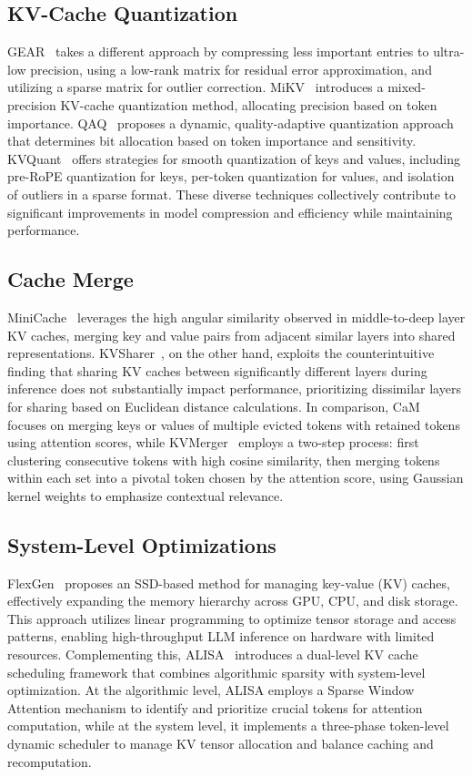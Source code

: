\subsection{KV-Cache Quantization}
GEAR~\cite{gear} takes a different approach by compressing less important entries to ultra-low precision, using a low-rank matrix for residual error approximation, and utilizing a sparse matrix for outlier correction. MiKV~\cite{notokenleftbehind} introduces a mixed-precision KV-cache quantization method, allocating precision based on token importance. QAQ~\cite{qaq} proposes a dynamic, quality-adaptive quantization approach that determines bit allocation based on token importance and sensitivity. KVQuant~\cite{hooper2024kvquant} offers strategies for smooth quantization of keys and values, including pre-RoPE quantization for keys, per-token quantization for values, and isolation of outliers in a sparse format. These diverse techniques collectively contribute to significant improvements in model compression and efficiency while maintaining performance.

\subsection{Cache Merge}
MiniCache~\cite{minicache} leverages the high angular similarity observed in middle-to-deep layer KV caches, merging key and value pairs from adjacent similar layers into shared representations. KVSharer~\cite{yang2024kvsharer}, on the other hand, exploits the counterintuitive finding that sharing KV caches between significantly different layers during inference does not substantially impact performance, prioritizing dissimilar layers for sharing based on Euclidean distance calculations. In comparison,  CaM~\cite{cam} focuses on merging keys or values of multiple evicted tokens with retained tokens using attention scores, while KVMerger~\cite{wang2024model} employs a two-step process: first clustering consecutive tokens with high cosine similarity, then merging tokens within each set into a pivotal token chosen by the attention score, using Gaussian kernel weights to emphasize contextual relevance. 

\subsection{System-Level Optimizations}
FlexGen~\cite{flexgen} proposes an SSD-based method for managing key-value (KV) caches, effectively expanding the memory hierarchy across GPU, CPU, and disk storage. This approach utilizes linear programming to optimize tensor storage and access patterns, enabling high-throughput LLM inference on hardware with limited resources. Complementing this, ALISA~\cite{alisa} introduces a dual-level KV cache scheduling framework that combines algorithmic sparsity with system-level optimization. At the algorithmic level, ALISA employs a Sparse Window Attention mechanism to identify and prioritize crucial tokens for attention computation, while at the system level, it implements a three-phase token-level dynamic scheduler to manage KV tensor allocation and balance caching and recomputation.

